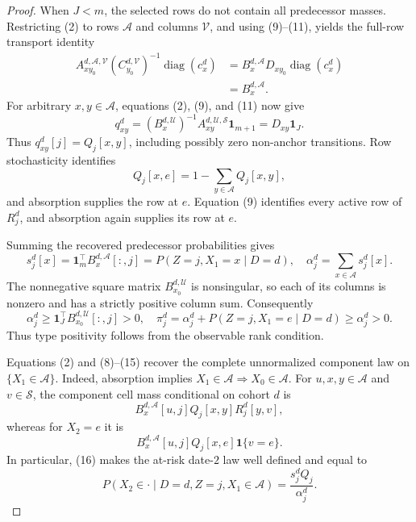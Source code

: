 \documentclass{article}
\begin{document}
\begin{proof}
When \(J<m\), the selected rows do not contain all predecessor masses.  Restricting (2) to rows \(\mathcal A\) and columns \(\mathcal V\), and using (9)--(11), yields the full-row transport identity
\[
\begin{aligned}
 A_{xy_0}^{d,\mathcal A,\mathcal V}(C_{y_0}^{d,\mathcal V})^{-1}
 \operatorname{diag}(c_x^d)
 &=B_x^{d,\mathcal A}D_{xy_0}\operatorname{diag}(c_x^d)\\
 &=B_x^{d,\mathcal A}.
\end{aligned}
\tag{12}
\]
For arbitrary \(x,y\in\mathcal A\), equations (2), (9), and (11) now give
\[
 q_{xy}^d=(B_x^{d,\mathcal U})^{-1}
 A_{xy}^{d,\mathcal U,\mathcal S}\mathbf1_{m+1}
 =D_{xy}\mathbf1_J.
\tag{13}
\]
Thus \(q_{xy}^d[j]=Q_j[x,y]\), including possibly zero non-anchor transitions.  Row stochasticity identifies
\[
 Q_j[x,e]=1-\sum_{y\in\mathcal A}Q_j[x,y],
\tag{14}
\]
and absorption supplies the row at \(e\).  Equation (9) identifies every active row of \(R_j^d\), and absorption again supplies its row at \(e\).

Summing the recovered predecessor probabilities gives
\[
 s_j^d[x]=\mathbf1_m^\top B_x^{d,\mathcal A}[:,j]
 =P(Z=j,X_1=x\mid D=d),
 \quad
 \alpha_j^d=\sum_{x\in\mathcal A}s_j^d[x].
\tag{15}
\]
The nonnegative square matrix \(B_{x_0}^{d,\mathcal U}\) is nonsingular, so each of its columns is nonzero and has a strictly positive column sum.  Consequently
\[
 \alpha_j^d\geq\mathbf1_J^\top B_{x_0}^{d,\mathcal U}[:,j]>0,
 \quad
 \pi_j^d=\alpha_j^d+P(Z=j,X_1=e\mid D=d)\geq\alpha_j^d>0.
\tag{16}
\]
Thus type positivity follows from the observable rank condition.

Equations (2) and (8)--(15) recover the complete unnormalized component law on \(\{X_1\in\mathcal A\}\).  Indeed, absorption implies \(X_1\in\mathcal A\Rightarrow X_0\in\mathcal A\).  For \(u,x,y\in\mathcal A\) and \(v\in\mathcal S\), the component cell mass conditional on cohort \(d\) is
\[
 B_x^{d,\mathcal A}[u,j]Q_j[x,y]R_j^d[y,v],
\tag{17}
\]
whereas for \(X_2=e\) it is
\[
 B_x^{d,\mathcal A}[u,j]Q_j[x,e]\mathbf1\{v=e\}.
\]
In particular, (16) makes the at-risk date-\(2\) law well defined and equal to
\[
 P(X_2\in\cdot\mid D=d,Z=j,X_1\in\mathcal A)
 =\frac{s_j^dQ_j}{\alpha_j^d}.
\tag{18}
\]


\end{proof}
\end{document}
